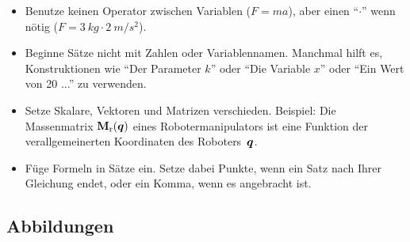 \begin{itemize}

\item Benutze  keinen Operator zwischen Variablen ($F=ma$), aber einen ``$\cdot$'' wenn nötig ($F=\SI{3}{kg}\cdot\SI{2}{m/s^2}$).

\item Beginne Sätze nicht mit Zahlen oder Variablennamen. Manchmal hilft es, Konstruktionen wie ``Der Parameter $k$'' oder ``Die Variable $x$'' oder ``Ein Wert von 20 ...'' zu verwenden.

\item Setze Skalare, Vektoren und Matrizen verschieden. Beispiel:
Die Massenmatrix $\mathbf{M}_{\mathrm{r}}(\boldsymbol{q})$ eines Robotermanipulators ist eine Funktion der verallgemeinerten Koordinaten des Roboters~$\boldsymbol{q}$.

\item Füge Formeln in Sätze ein. Setze dabei Punkte, wenn ein Satz nach Ihrer Gleichung endet, oder ein Komma, wenn es angebracht ist. 
\end{itemize}


\subsection{Abbildungen}

